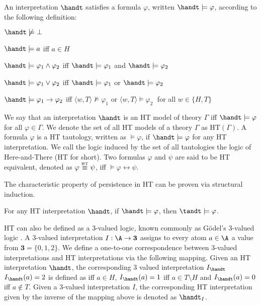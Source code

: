 \begin{definition}[HT satisfaction]
    An interpretation $\handt$ satisfies a formula $\varphi$, written $\handt \models \varphi$, according to the following definition:
    \begin{description}
        \item $\handt \not \models \bot$
        \item $\handt \models a$ iff $a\in H$
        \item $\handt \models \varphi_1 \wedge \varphi_2$ iff $\handt \models \varphi_1$ and  $\handt \models \varphi_2$
        \item $\handt \models \varphi_1 \vee \varphi_2$ iff $\handt \models \varphi_1$ or  $\handt \models \varphi_2$
        \item $\handt \models \varphi_1 \to \varphi_2$ iff $\langle w,T \rangle \not \models \varphi_1$ or  $\langle w,T \rangle \models \varphi_2\;$ for all 
        $w \in \{H,T\}$
    \end{description}
\end{definition}

We say that an interpretation $\handt$ is an HT model of theory
$\Gamma$ iff $\handt \models \varphi$ for all $\varphi \in \Gamma$. We
denote the set of all HT models of a theory $\Gamma$ as
$\text{HT}(\Gamma)$. A formula $\varphi$ is a HT tautology, written as
$\models \varphi$, if $\handt \models \varphi$ for any HT
interpretation. We call the logic induced by the set of all
tautologies the logic of Here-and-There (HT for short). Two formulas
$\varphi$ and $\psi$ are said to be HT equivalent, denoted as
$\varphi \stackrel{\normalfont\mbox{\tiny HT}}{\equiv} \psi$, iff $\models \varphi \leftrightarrow \psi$.

The characteristic property of persistence in HT can be proven via
structural induction.

\begin{proposition}[Persistence]
  For any HT interpretation $\handt$, if $\handt \models \varphi$,
  then $\tandt \models \varphi$.
\end{proposition}

HT can also be defined as a 3-valued logic, known commonly as Gödel's
3-valued logic \cite{capeva05a}. A 3-valued interpretation
$I: \A \rightarrow \textbf{3}$ assigns to every atom $a\in \A$ a value
from $\textbf{3}=\{ 0, 1, 2 \}$. We define a one-to-one correspondence
between 3-valued interpretations and HT interpretations via the
following mapping. Given an HT interpretation $\handt$, the
corresponding 3 valued interpretation $I_{\handt}$ $I_{\handt}(a)=2$
is defined as iff $a \in H$, $I_{\handt}(a)=1$ iff
$a \in T \setminus H$ and $I_{\handt}(a)=0$ iff $a \not\in T$. Given a
3-valued interpretation $I$, the corresponding HT interpretation given
by the inverse of the mapping above is denoted as $\handt_{I}$. 

